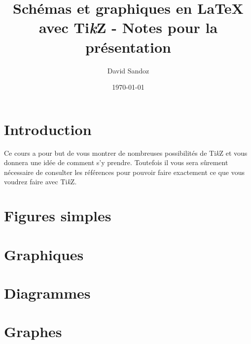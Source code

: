 \documentclass[11pt]{article}
\newcommand{\TikZ}{Ti\textit{k}Z}
\begin{document}
\title{Schémas et graphiques en \LaTeX{} avec \TikZ{} - Notes pour la présentation}
\author{David Sandoz}
\date{\today}
\maketitle

\section{Introduction}
Ce cours a pour but de vous montrer de nombreuses possibilités de \TikZ{} et vous donnera une idée de comment s'y prendre. Toutefois il vous sera sûrement nécessaire de consulter les références pour pouvoir faire exactement ce que vous voudrez faire avec \TikZ.
\section{Figures simples}
\section{Graphiques}
\section{Diagrammes}
\section{Graphes}
\end{document}

